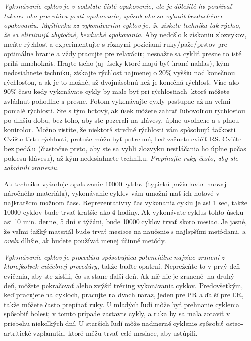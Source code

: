 \emph{Vykonávanie cyklov je v podstate čisté opakovanie, ale je dôležité ho používať takmer ako procedúru proti opakovaniu, spôsob ako sa vyhnúť bezduchému opakovaniu. Myšlienka za vykonávaním cyklov je, že získate techniku tak rýchlo, že sa eliminujú zbytočné, bezduché opakovania.} Aby nedošlo k získaniu zlozvykov, meňte rýchlosť a experimentujte s rôznymi pozíciami ruky/paže/prstov pre optimálne hranie a vždy pracujte pre relaxáciu; nesnažte sa cykliť presne to isté príliš mnohokrát. Hrajte ticho (aj úseky ktoré majú byť hrané nahlas), kým nedosiahnete techniku, získajte rýchlosť najmenej o 20\% vyššiu nad konečnou rýchlosťou, a ak je to možné, až dvojnásobnú než je konečná rýchlosť. Viac ako 90\% času kedy vykonávate cykly by malo byť pri rýchlostiach, ktoré môžete zvládnuť pohodlne a presne. Potom vykonávajte cykly postupne až na veľmi pomalé rýchlosti. Ste s tým hotový, ak úsek môžete zahrať ľubovoľnou rýchlosťou po dlhšiu dobu, bez toho, aby ste pozerali na klávesy, úplne uvoľnene a s plnou kontrolou. Možno zistíte, že niektoré stredné rýchlosti vám spôsobujú ťažkosti. Cvičte tieto rýchlosti, pretože môžu byť potrebné, keď začnete cvičiť RS. Cvičte bez pedálu (čiastočne preto, aby ste sa vyhli zlozvyku nestláčania ho úplne počas poklesu klávesu), až kým nedosiahnete techniku. \emph{Prepínajte ruky často, aby ste zabránili zraneniu.}

Ak technika vyžaduje opakovanie 10000 cyklov (typická požiadavka naozaj náročného materiálu), vykonávanie cyklov vám umožní mať ich hotové v najkratšom možnom čase. Reprezentatívny čas vykonania cyklu je asi 1 sec, takže 10000 cyklov bude trvať kratšie ako 4 hodiny. Ak vykonávate cyklus tohto úseku asi 10 min. denne, 5 dní v týždni, bude 10000 cyklov trvať skoro mesiac. Je jasné, že veľmi ťažký materiál bude trvať mesiace na naučenie s najlepšími metódami, a \textit{oveľa} dlhšie, ak budete používať menej účinné metódy.

\emph{Vykonávanie cyklov je procedúra spôsobujúca potenciálne najviac zranení z ktorejkoľvek cvičebnej procedúry,} takže buďte opatrní. Neprežeňte to v prvý deň cvičenia, aby ste zistili, čo sa stane ďalší deň. Ak nič nie je zranené, na druhý deň, môžete pokračovať alebo zvýšiť tréning vykonávania cyklov. Predovšetkým, keď pracujete na cykloch, pracujte na dvoch naraz, jeden pre PR a ďalší pre ĽR, takže môžete často prepínať ruky. U mladých ľudí môže byť prehnanie cyklenia spôsobiť bolesť; v tomto prípade zastavte cykly, a ruka by sa mala zotaviť v priebehu niekoľkých dní. U starších ľudí môže nadmerné cyklenie spôsobiť osteo-artritické vzplanutia, ktoré môžu trvať celé mesiace, aby ustúpili.

